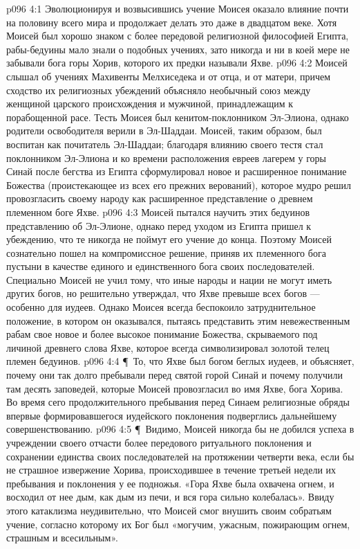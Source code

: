 \vs p096 4:1 Эволюционируя и возвысившись учение Моисея оказало влияние почти на половину всего мира и продолжает делать это даже в двадцатом веке. Хотя Моисей был хорошо знаком с более передовой религиозной философией Египта, рабы\hyp{}бедуины мало знали о подобных учениях, зато никогда и ни в коей мере не забывали бога горы Хорив, которого их предки называли Яхве.
\vs p096 4:2 Моисей слышал об учениях Махивенты Мелхиседека и от отца, и от матери, причем сходство их религиозных убеждений объясняло необычный союз между женщиной царского происхождения и мужчиной, принадлежащим к порабощенной расе. Тесть Моисея был кенитом\hyp{}поклонником Эл\hyp{}Элиона, однако родители освободителя верили в Эл\hyp{}Шаддаи. Моисей, таким образом, был воспитан как почитатель Эл\hyp{}Шаддаи; благодаря влиянию своего тестя стал поклонником Эл\hyp{}Элиона и ко времени расположения евреев лагерем у горы Синай после бегства из Египта сформулировал новое и расширенное понимание Божества (проистекающее из всех его прежних верований), которое мудро решил провозгласить своему народу как расширенное представление о древнем племенном боге Яхве.
\vs p096 4:3 Моисей пытался научить этих бедуинов представлению об Эл\hyp{}Элионе, однако перед уходом из Египта пришел к убеждению, что те никогда не поймут его учение до конца. Поэтому Моисей сознательно пошел на компромиссное решение, приняв их племенного бога пустыни в качестве единого и единственного бога своих последователей. Специально Моисей не учил тому, что иные народы и нации не могут иметь других богов, но решительно утверждал, что Яхве превыше всех богов --- особенно для иудеев. Однако Моисея всегда беспокоило затруднительное положение, в котором он оказывался, пытаясь представить этим невежественным рабам свое новое и более высокое понимание Божества, скрываемого под личиной древнего слова Яхве, которое всегда символизировал золотой телец племен бедуинов.
\vs p096 4:4 \P\ То, что Яхве был богом беглых иудеев, и объясняет, почему они так долго пребывали перед святой горой Синай и почему получили там десять заповедей, которые Моисей провозгласил во имя Яхве, бога Хорива. Во время сего продолжительного пребывания перед Синаем религиозные обряды впервые формировавшегося иудейского поклонения подверглись дальнейшему совершенствованию.
\vs p096 4:5 \P\ Видимо, Моисей никогда бы не добился успеха в учреждении своего отчасти более передового ритуального поклонения и сохранении единства своих последователей на протяжении четверти века, если бы не страшное извержение Хорива, происходившее в течение третьей недели их пребывания и поклонения у ее подножья. «Гора Яхве была охвачена огнем, и восходил от нее дым, как дым из печи, и вся гора сильно колебалась». Ввиду этого катаклизма неудивительно, что Моисей смог внушить своим собратьям учение, согласно которому их Бог был «могучим, ужасным, пожирающим огнем, страшным и всесильным».
